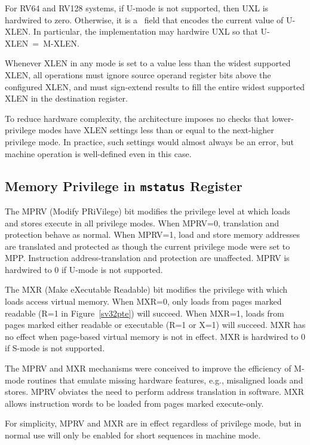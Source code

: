 For RV64 and RV128 systems, if U-mode is not supported, then UXL is hardwired
to zero.  Otherwise, it is a \warl\ field that encodes the current value of
U-XLEN.  In particular, the implementation may hardwire UXL so that
U-XLEN~=~M-XLEN.

Whenever XLEN in any mode is set to a value less than the widest
supported XLEN, all operations must ignore source operand register
bits above the configured XLEN, and must sign-extend results to fill
the entire widest supported XLEN in the destination register.

\begin{commentary}
To reduce hardware complexity, the architecture imposes no checks that
lower-privilege modes have XLEN settings less than or equal to the
next-higher privilege mode.  In practice, such settings would almost
always be an error, but machine operation is well-defined even in this
case.
\end{commentary}

\subsection{Memory Privilege in {\tt mstatus} Register}

The MPRV (Modify PRiVilege) bit modifies the privilege level at which
loads and stores execute in all privilege modes.  When MPRV=0,
translation and protection behave as normal.  When MPRV=1, load and
store memory addresses are translated and protected as though the
current privilege mode were set to MPP.  Instruction
address-translation and protection are unaffected.  MPRV is hardwired
to 0 if U-mode is not supported.

The MXR (Make eXecutable Readable) bit modifies the privilege with which loads
access virtual memory.  When MXR=0, only loads from pages marked readable (R=1
in Figure~\ref{sv32pte}) will succeed.  When MXR=1, loads from pages marked
either readable or executable (R=1 or X=1) will succeed.  MXR has no effect
when page-based virtual memory is not in effect.  MXR is hardwired to 0 if
S-mode is not supported.

\begin{commentary}
The MPRV and MXR mechanisms were conceived to improve the efficiency of M-mode
routines that emulate missing hardware features, e.g., misaligned loads and
stores.  MPRV obviates the need to perform address translation in software.
MXR allows instruction words to be loaded from pages marked execute-only.

For simplicity, MPRV and MXR are in effect regardless of privilege
mode, but in normal use will only be enabled for short sequences in
machine mode.
\end{commentary}


